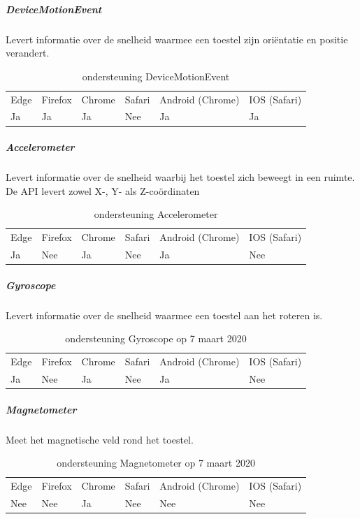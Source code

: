 	\subparagraph{DeviceMotionEvent }
	Levert informatie over de snelheid waarmee een toestel zijn oriëntatie en positie verandert.
	
	\begin{table}[H]
		\centering
		\begin{tabular}{llllll}
			Edge & Firefox & Chrome & Safari & Android (Chrome) & IOS (Safari) \\
			Ja   & Ja      &  Ja   & Nee     & Ja               & Ja          
		\end{tabular}	
		\caption{ondersteuning	DeviceMotionEvent  }
	\end{table} 
	
	
	\subparagraph{Accelerometer  }
		Levert informatie over de snelheid waarbij het toestel zich beweegt in een ruimte. De API levert zowel X-, Y- als Z-coördinaten
		
		\begin{table}[H]
			\centering
			\begin{tabular}{llllll}
				Edge & Firefox & Chrome & Safari & Android (Chrome) & IOS (Safari) \\
				Ja   & Nee      &  Ja   & Nee     & Ja               & Nee          
			\end{tabular}	
			\caption{ondersteuning	Accelerometer   }
		\end{table}
		
		
		
	\subparagraph{Gyroscope  }
		Levert informatie over de snelheid waarmee een toestel aan het roteren is. 
			
		\begin{table}[H]
			\centering
			\begin{tabular}{llllll}
				Edge & Firefox & Chrome & Safari & Android (Chrome) & IOS (Safari) \\
				Ja   & Nee      &  Ja   & Nee     & Ja               & Nee          
			\end{tabular}	
			\caption{ondersteuning Gyroscope op 7 maart 2020 }
		\end{table}
			
	\subparagraph{Magnetometer }
			Meet het magnetische veld rond het toestel. 
			
		\begin{table}[H]
			\centering
			\begin{tabular}{llllll}
				Edge & Firefox & Chrome & Safari & Android (Chrome) & IOS (Safari) \\
				Nee   & Nee      &  Ja   & Nee     & Nee               & Nee          
			\end{tabular}	
			\caption{ondersteuning Magnetometer op 7 maart 2020 }
		\end{table}
			
